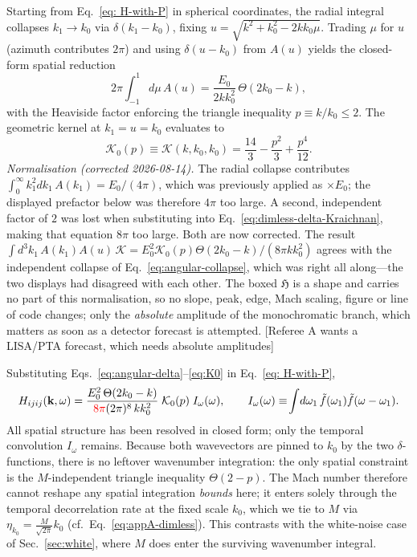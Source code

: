 \documentclass[10pt,prd,aps,nobibnotes,superscriptaddress,preprintnumbers,notitlepage]{revtex4-1}
\newcommand{\add}[1]{{\color{red}#1}}
\newcommand{\why}[1]{{\color{red}\footnotesize\textsf{[#1]}}}
\newcommand{\add}[1]{#1}
\newcommand{\why}[1]{}
\newcommand{\kb}{{\bf k}}
\newcommand{\tf}{\tilde{f}}
\begin{document}
Starting from Eq.~\eqref{eq: H-with-P} in spherical coordinates, the radial integral collapses $k_1\to k_0$ via $\delta(k_1-k_0)$, fixing $u=\sqrt{k^2+k_0^2-2kk_0\mu}$. Trading $\mu$ for $u$ (azimuth contributes $2\pi$) and using $\delta(u-k_0)$ from $A(u)$ yields the closed-form spatial reduction
\begin{equation}
  2\pi\!\int_{-1}^{1}\!d\mu\,A(u) = \frac{E_0}{2k k_0^2}\,\Theta(2k_0-k),
  \label{eq:angular-delta}
\end{equation}
with the Heaviside factor enforcing the triangle inequality $p \equiv k/k_0 \leq 2$. The geometric kernel at $k_1=u=k_0$ evaluates to
\begin{equation}
  \mathcal{K}_0(p) \equiv \mathcal{K}(k,k_0,k_0) = \frac{14}{3} - \frac{p^2}{3} + \frac{p^4}{12}.
  \label{eq:K0}
\end{equation}
\add{\noindent\emph{Normalisation (corrected 2026-08-14).} The radial collapse
contributes $\int_0^\infty k_1^2dk_1\,A(k_1)=E_0/(4\pi)$, which was previously applied
as $\times E_0$; the displayed prefactor below was therefore $4\pi$ too large. A second,
independent factor of $2$ was lost when substituting into
Eq.~\eqref{eq:dimless-delta-Kraichnan}, making that equation $8\pi$ too large. Both are
now corrected. The result
$\int d^3k_1\,A(k_1)A(u)\,\mathcal{K}=E_0^2\mathcal{K}_0(p)\Theta(2k_0-k)/(8\pi k k_0^2)$
agrees with the independent collapse of Eq.~\eqref{eq:angular-collapse}, which was right
all along---the two displays had disagreed with each other. The boxed $\mathfrak{H}$ is a
shape and carries no part of this normalisation, so no slope, peak, edge, Mach scaling,
figure or line of code changes; only the \emph{absolute} amplitude of the monochromatic
branch, which matters as soon as a detector forecast is attempted.}
\why{Referee A wants a LISA/PTA forecast, which needs absolute amplitudes}

Substituting Eqs.~\eqref{eq:angular-delta}--\eqref{eq:K0} in Eq.~\eqref{eq: H-with-P},
\begin{equation}
  H_{ijij}(\kb,\omega)
  = \frac{E_0^2\,\Theta(2k_0-k)}{\add{8\pi}(2\pi)^8\,k k_0^2}\;\mathcal{K}_0(p)\;I_\omega(\omega),
  \qquad
  I_\omega(\omega)\equiv\!\int\!d\omega_1\,\tf(\omega_1)\tf(\omega-\omega_1).
  \label{eq:H-delta-k}
\end{equation}
All spatial structure has been resolved in closed form; only the temporal convolution $I_\omega$ remains. Because both wavevectors are pinned to $k_0$ by the two $\delta$-functions, there is no leftover wavenumber integration: the only spatial constraint is the $M$-independent triangle inequality $\Theta(2-p)$. The Mach number therefore cannot reshape any spatial integration \emph{bounds} here; it enters solely through the temporal decorrelation rate at the fixed scale $k_0$, which we tie to $M$ via $\eta_{k_0}=\tfrac{M}{\sqrt{2\pi}}k_0$ (cf.\ Eq.~\eqref{eq:appA-dimless}). This contrasts with the white-noise case of Sec.~\ref{sec:white}, where $M$ does enter the surviving wavenumber integral.
\end{document}
